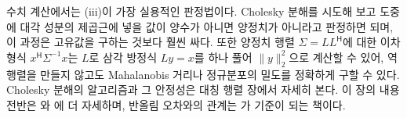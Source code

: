 수치 계산에서는 (iii)이 가장 실용적인 판정법이다. Cholesky 분해를 시도해 보고 도중에 대각 성분의 제곱근에 넣을 값이 양수가 아니면 양정치가 아니라고 판정하면 되며, 이 과정은 고유값을 구하는 것보다 훨씬 싸다. 또한 양정치 행렬 $\Sigma=LL^{\mathsf H}$에 대한 이차 형식 $x^{\mathsf H}\Sigma^{-1}x$는 $L$로 삼각 방정식 $Ly=x$를 하나 풀어 $\|y\|_2^2$으로 계산할 수 있어, 역행렬을 만들지 않고도 Mahalanobis 거리나 정규분포의 밀도를 정확하게 구할 수 있다. Cholesky 분해의 알고리즘과 그 안정성은 대칭 행렬 장에서 자세히 본다. 이 장의 내용 전반은 \cite{horn2013matrix}와 \cite{golub2013matrix}에 더 자세하며, 반올림 오차와의 관계는 \cite{higham2002accuracy}가 기준이 되는 책이다.

\chapterreferences

